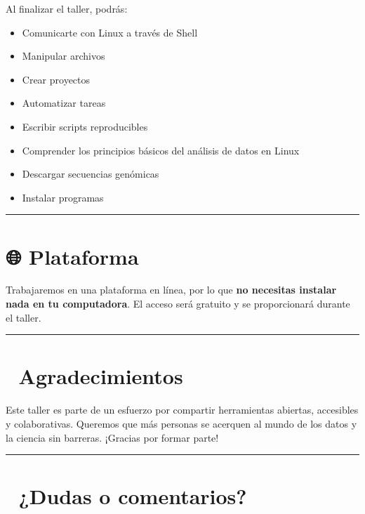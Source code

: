 \documentclass[
]{book}
\providecommand{\tightlist}{%
  \setlength{\itemsep}{0pt}\setlength{\parskip}{0pt}}
\begin{document}
Al finalizar el taller, podrás:

\begin{itemize}
\tightlist
\item
  Comunicarte con Linux a través de Shell
\item
  Manipular archivos\\
\item
  Crear proyectos
\item
  Automatizar tareas
\item
  Escribir scripts reproducibles\\
\item
  Comprender los principios básicos del análisis de datos en Linux
\item
  Descargar secuencias genómicas
\item
  Instalar programas
\end{itemize}

\begin{center}\rule{0.5\linewidth}{0.5pt}\end{center}

\section{🌐 Plataforma}\label{plataforma}

Trabajaremos en una plataforma en línea, por lo que \textbf{no necesitas instalar nada en tu computadora}. El acceso será gratuito y se proporcionará durante el taller.

\begin{center}\rule{0.5\linewidth}{0.5pt}\end{center}

\section{🙌 Agradecimientos}\label{agradecimientos}

Este taller es parte de un esfuerzo por compartir herramientas abiertas, accesibles y colaborativas. Queremos que más personas se acerquen al mundo de los datos y la ciencia sin barreras. ¡Gracias por formar parte!

\begin{center}\rule{0.5\linewidth}{0.5pt}\end{center}

\section{💬 ¿Dudas o comentarios?}\label{dudas-o-comentarios}
\end{document}
